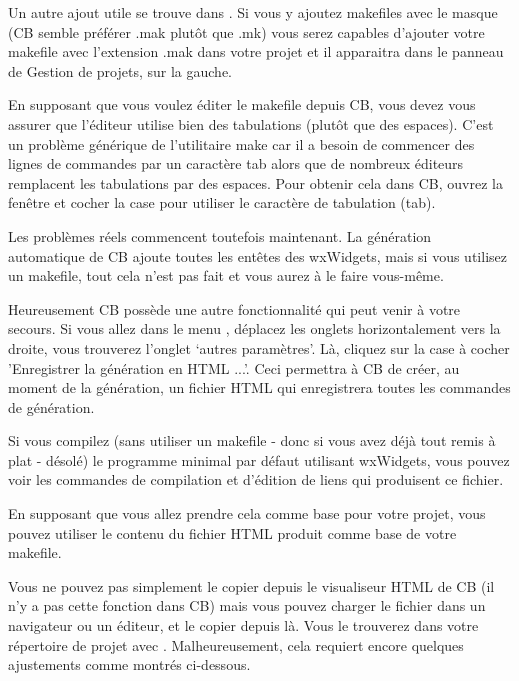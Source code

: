 Un autre ajout utile se trouve dans . Si vous y ajoutez makefiles avec le masque  (CB semble préférer .mak plutôt que .mk) vous serez capables d'ajouter votre makefile avec l'extension .mak dans votre projet et il apparaitra dans le panneau de Gestion de projets, sur la gauche.

En supposant que vous voulez éditer le makefile depuis CB, vous devez vous assurer que l'éditeur utilise bien des tabulations (plutôt que des espaces). C'est un problème générique de l'utilitaire make car il a besoin de commencer des lignes de commandes par un caractère tab alors que de nombreux éditeurs remplacent les tabulations par des espaces. Pour obtenir cela dans CB, ouvrez la fenêtre  et cocher la case pour utiliser le caractère de tabulation (tab).

Les problèmes réels commencent toutefois maintenant. La génération automatique de CB ajoute toutes les entêtes des wxWidgets, mais si vous utilisez un makefile, tout cela n'est pas fait et vous aurez à le faire vous-même.

Heureusement CB possède une autre fonctionnalité qui peut venir à votre secours. Si vous allez dans le menu , déplacez les onglets horizontalement vers la droite, vous trouverez l'onglet ‘autres paramètres’. Là, cliquez sur la case à cocher  'Enregistrer la génération en HTML ...'. Ceci permettra à CB de créer, au moment de la génération, un fichier HTML qui enregistrera toutes les commandes de génération.


Si vous compilez (sans utiliser un makefile - donc si vous avez déjà tout remis à plat - désolé) le programme minimal par défaut utilisant wxWidgets, vous pouvez voir les commandes de compilation et d'édition de liens qui produisent ce fichier.

En supposant que vous allez prendre cela comme base pour votre projet, vous pouvez utiliser le contenu du fichier HTML produit comme base de votre makefile.

Vous ne pouvez pas simplement le copier depuis le visualiseur HTML de CB (il n'y a pas cette fonction dans CB) mais vous pouvez charger le fichier dans un navigateur ou un éditeur, et le copier depuis là. Vous le trouverez dans votre répertoire de projet avec . Malheureusement, cela requiert encore quelques ajustements comme montrés ci-dessous.

